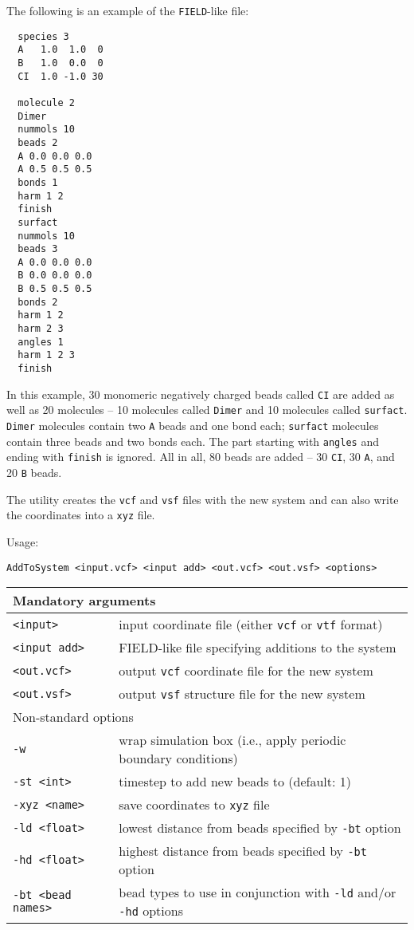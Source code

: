 The following is an example of the \texttt{FIELD}-like file:
\begin{verbatim}
  species 3
  A   1.0  1.0  0
  B   1.0  0.0  0
  CI  1.0 -1.0 30

  molecule 2
  Dimer
  nummols 10
  beads 2
  A 0.0 0.0 0.0
  A 0.5 0.5 0.5
  bonds 1
  harm 1 2
  finish
  surfact
  nummols 10
  beads 3
  A 0.0 0.0 0.0
  B 0.0 0.0 0.0
  B 0.5 0.5 0.5
  bonds 2
  harm 1 2
  harm 2 3
  angles 1
  harm 1 2 3
  finish
\end{verbatim}
In this example, 30 monomeric negatively charged beads called \texttt{CI}
are added as well as 20 molecules -- 10 molecules called \texttt{Dimer} and
10 molecules called \texttt{surfact}. \texttt{Dimer} molecules contain two
\texttt{A} beads and one bond each; \texttt{surfact} molecules contain
three beads and two bonds each. The part starting with \texttt{angles} and
ending with \texttt{finish} is ignored. All in all, 80 beads are added --
30 \texttt{CI}, 30 \texttt{A}, and 20 \texttt{B} beads.

The utility creates the \texttt{vcf} and \texttt{vsf} files with the new
system and can also write the coordinates into a \texttt{xyz} file.

Usage:

\vspace{1em}
\noindent
\texttt{AddToSystem <input.vcf> <input add> <out.vcf> <out.vsf> <options>}

\vspace{1em}
\noindent
\begin{longtable}{p{}p{}}
  \toprule
  \multicolumn{2}{l}{Mandatory arguments} \\
  \midrule
  \texttt{<input>} & input coordinate file (either \texttt{vcf} or
    \texttt{vtf} format) \\
  \texttt{<input add>} & FIELD-like file specifying additions to the system \\
  \texttt{<out.vcf>} & output \texttt{vcf} coordinate file for the new
  system \\
  \texttt{<out.vsf>} & output \texttt{vsf} structure file for the new system \\
  \toprule
  \multicolumn{2}{l}{Non-standard options} \\
  \midrule
  \texttt{-w} & wrap simulation box (i.e., apply periodic boundary conditions) \\
  \texttt{-st <int>} & timestep to add new beads to (default: 1) \\
  \texttt{-xyz <name>} & save coordinates to \texttt{xyz} file \\
  \texttt{-ld <float>} & lowest distance from beads specified by
    \texttt{-bt} option \\
  \texttt{-hd <float>} & highest distance from beads specified by
    \texttt{-bt} option \\
  \texttt{-bt <bead names>} & bead types to use in conjunction with
    \texttt{-ld} and/or \texttt{-hd} options \\
  \bottomrule
\end{longtable}
